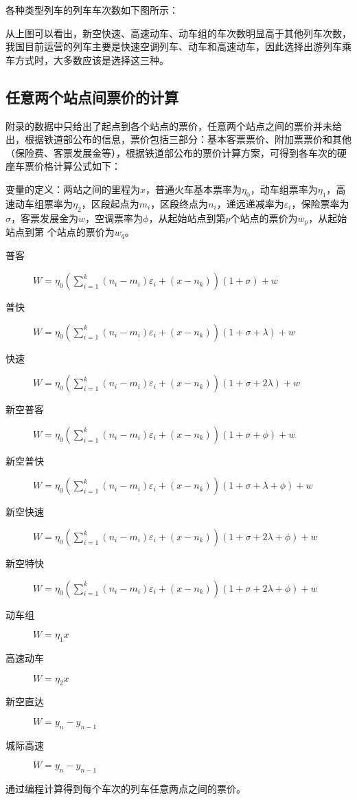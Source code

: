 \documentclass[UTF8]{ctexart}
\begin{document}
各种类型列车的列车车次数如下图所示：

从上图可以看出，新空快速、高速动车、动车组的车次数明显高于其他列车次数，我国目前运营的列车主要是快速空调列车、动车和高速动车，因此选择出游列车乘车方式时，大多数应该是选择这三种。

\subsection{任意两个站点间票价的计算}
附录的数据中只给出了起点到各个站点的票价，任意两个站点之间的票价并未给出，根据铁道部公布的信息，票价包括三部分：基本客票票价、附加票票价和其他（保险费、客票发展金等），根据铁道部公布的票价计算方案，可得到各车次的硬座车票价格计算公式如下：

变量的定义：两站之间的里程为$x$，普通火车基本票率为$\eta_0$，动车组票率为$\eta_1$，高速动车组票率为$\eta_2$，区段起点为$m_i$，区段终点为$n_i$，递远递减率为$\varepsilon_i$，保险票率为$\sigma$，客票发展金为$w$，空调票率为$\phi$，从起始站点到第$p$个站点的票价为$w_p$，从起始站点到第 个站点的票价为$w_q$。

\begin{description}
  \item[普客] $W = \eta_0 (\sum_{i=1}^k (n_i - m_i)\varepsilon_i + (x - n_k))(1+\sigma)+w$
  \item[普快] $W = \eta_0 (\sum_{i=1}^k (n_i - m_i)\varepsilon_i + (x - n_k))(1+\sigma+\lambda)+w$
  \item[快速] $W = \eta_0 (\sum_{i=1}^k (n_i - m_i)\varepsilon_i + (x - n_k))(1+\sigma+2\lambda)+w$
  \item[新空普客] $W = \eta_0 (\sum_{i=1}^k (n_i - m_i)\varepsilon_i + (x - n_k))(1+\sigma+\phi)+w$
  \item[新空普快] $W = \eta_0 (\sum_{i=1}^k (n_i - m_i)\varepsilon_i + (x - n_k))(1+\sigma+\lambda+\phi)+w$
  \item[新空快速] $W = \eta_0 (\sum_{i=1}^k (n_i - m_i)\varepsilon_i + (x - n_k))(1+\sigma+2\lambda+\phi)+w$
  \item[新空特快] $W = \eta_0 (\sum_{i=1}^k (n_i - m_i)\varepsilon_i + (x - n_k))(1+\sigma+2\lambda+\phi)+w$
  \item[动车组] $W = \eta_1 x$
  \item[高速动车] $W = \eta_2 x$
  \item[新空直达] $W = y_n - y_{n-1}$
  \item[城际高速] $W = y_n - y_{n-1}$
\end{description}
通过编程计算得到每个车次的列车任意两点之间的票价。
\end{document}
